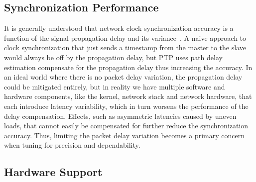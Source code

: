 \subsection{Synchronization Performance}
It is generally understood that network clock synchronization accuracy is a function of the signal propagation delay and its variance~\cite{managin-pdv-for-ptp}. A naive approach to clock synchronization that just sends a timestamp from the master to the slave would always be off by the propagation delay, but PTP uses path delay estimation compensate for the propagation delay thus increasing the accuracy. In an ideal world where there is no packet delay variation, the propagation delay could be mitigated entirely, but in reality we have multiple software and hardware components, like the kernel, network stack and network hardware, that each introduce latency variability, which in turn worsens the performance of the delay compensation. Effects, such as asymmetric latencies caused by uneven loads, that cannot easily be compensated for further reduce the synchronization accuracy. Thus, limiting the packet delay variation becomes a primary concern when tuning for precision and dependability.

\subsection{Hardware Support}

